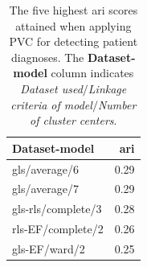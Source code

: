 \begin{table}
    \centering
    \begin{tabular}{lr}
        \toprule
        Dataset-model     &  \acrshort{ari} \\
        \midrule
        gls/average/6      & 0.29 \\
        gls/average/7      & 0.29 \\
        gls-rls/complete/3 & 0.28 \\
        rls-EF/complete/2  & 0.26 \\
        gls-EF/ward/2      & 0.25 \\
        \bottomrule
    \end{tabular}
    \caption{The five highest \acrshort{ari} scores attained when applying PVC for detecting patient diagnoses.
             The \textbf{Dataset-model} column indicates \textit{Dataset used}$/$\textit{Linkage criteria of model}$/$\textit{Number of cluster centers}.}
    \label{tab:pvc_ind_ari}
\end{table}

